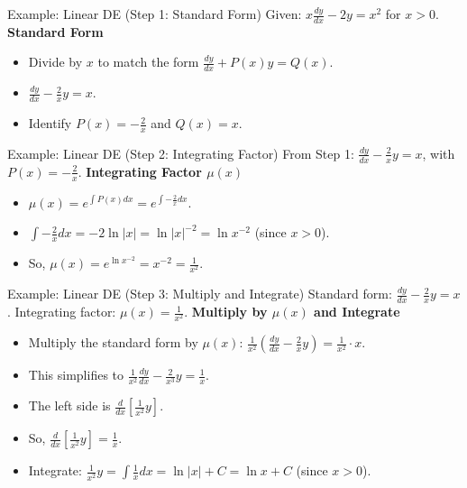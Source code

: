 \documentclass[10pt,aspectratio=169]{beamer}
\begin{document}
\begin{frame}{Example: Linear DE (Step 1: Standard Form)}
    Given: $x\frac{dy}{dx} - 2y = x^2$ for $x > 0$.
    \vspace{1em}
    \textbf{Standard Form}
    \begin{itemize}
        \item Divide by $x$ to match the form $\frac{dy}{dx} + P(x)y = Q(x)$.
        \item $\frac{dy}{dx} - \frac{2}{x}y = x$.
        \item Identify $P(x) = -\frac{2}{x}$ and $Q(x) = x$.
    \end{itemize}
\end{frame}

\begin{frame}{Example: Linear DE (Step 2: Integrating Factor)}
    From Step 1: $\frac{dy}{dx} - \frac{2}{x}y = x$, with $P(x) = -\frac{2}{x}$.
    \vspace{1em}
    \textbf{Integrating Factor $\mu(x)$}
    \begin{itemize}
        \item $\mu(x) = e^{\int P(x)dx} = e^{\int -\frac{2}{x}dx}$.
        \item $\int -\frac{2}{x}dx = -2\ln|x| = \ln|x|^{-2} = \ln x^{-2}$ (since $x > 0$).
        \item So, $\mu(x) = e^{\ln x^{-2}} = x^{-2} = \frac{1}{x^2}$.
    \end{itemize}
\end{frame}

\begin{frame}{Example: Linear DE (Step 3: Multiply and Integrate)}
    Standard form: $\frac{dy}{dx} - \frac{2}{x}y = x$. Integrating factor: $\mu(x) = \frac{1}{x^2}$.
    \vspace{1em}
    \textbf{Multiply by $\mu(x)$ and Integrate}
    \begin{itemize}
        \item Multiply the standard form by $\mu(x)$: $\frac{1}{x^2}\left(\frac{dy}{dx} - \frac{2}{x}y\right) = \frac{1}{x^2} \cdot x$.
        \item This simplifies to $\frac{1}{x^2}\frac{dy}{dx} - \frac{2}{x^3}y = \frac{1}{x}$.
        \item The left side is $\frac{d}{dx}\left[\frac{1}{x^2}y\right]$.
        \item So, $\frac{d}{dx}\left[\frac{1}{x^2}y\right] = \frac{1}{x}$.
        \item Integrate: $\frac{1}{x^2}y = \int \frac{1}{x}dx = \ln|x| + C = \ln x + C$ (since $x > 0$).
    \end{itemize}
\end{frame}
\end{document}
